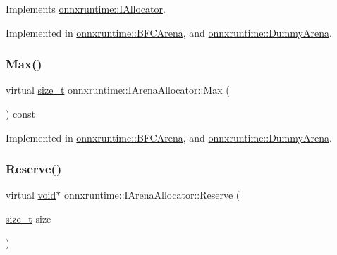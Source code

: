 Implements \mbox{\hyperlink{classonnxruntime_1_1IAllocator_a384b9f03d2346999b7b9ce3b225982a3}{onnxruntime\+::\+I\+Allocator}}.



Implemented in \mbox{\hyperlink{classonnxruntime_1_1BFCArena_acf4fc8182c636a16d62e80cf051da0e2}{onnxruntime\+::\+B\+F\+C\+Arena}}, and \mbox{\hyperlink{classonnxruntime_1_1DummyArena_a7f85a06ef904b9fe007e76d18a8d68a9}{onnxruntime\+::\+Dummy\+Arena}}.

\mbox{\label{classonnxruntime_1_1IArenaAllocator_a09710487a52f42135ee804b7d2e2ed71}} 
\subsubsection{\texorpdfstring{Max()}{Max()}}
{\footnotesize\ttfamily virtual \mbox{\hyperlink{mlasi_8h_a503efbc1c6e50825320ad909366b78ab}{size\+\_\+t}} onnxruntime\+::\+I\+Arena\+Allocator\+::\+Max (\begin{DoxyParamCaption}{ }\end{DoxyParamCaption}) const\hspace{0.3cm}{\ttfamily [pure virtual]}}



Implemented in \mbox{\hyperlink{classonnxruntime_1_1BFCArena_a86661567f79140806c715e5abe56040a}{onnxruntime\+::\+B\+F\+C\+Arena}}, and \mbox{\hyperlink{classonnxruntime_1_1DummyArena_ae4edcff60bded3201a9852c6bc935276}{onnxruntime\+::\+Dummy\+Arena}}.

\mbox{\label{classonnxruntime_1_1IArenaAllocator_ae39a9a84e17eb83bb779149fb212004a}} 
\subsubsection{\texorpdfstring{Reserve()}{Reserve()}}
{\footnotesize\ttfamily virtual \mbox{\hyperlink{mlasi_8h_a88f941d423cb2a819b70a1358982b1a6}{void}}$\ast$ onnxruntime\+::\+I\+Arena\+Allocator\+::\+Reserve (\begin{DoxyParamCaption}\item[{\mbox{\hyperlink{mlasi_8h_a503efbc1c6e50825320ad909366b78ab}{size\+\_\+t}}}]{size }\end{DoxyParamCaption})\hspace{0.3cm}{\ttfamily [pure virtual]}}



